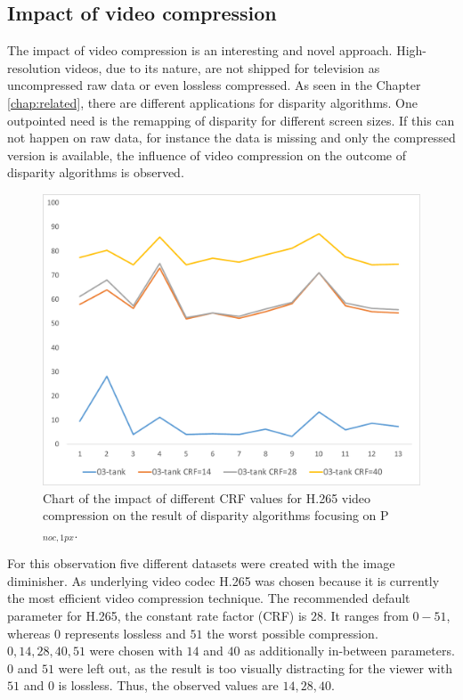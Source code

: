 \subsection{Impact of video compression}

The impact of video compression is an interesting and novel approach.
High-resolution videos, due to its nature, are not shipped for television as uncompressed raw data or even lossless compressed.
As seen in the Chapter \ref{chap:related}, there are different applications for disparity algorithms.
One outpointed need is the remapping of disparity for different screen sizes.
If this can not happen on raw data, for instance the data is missing and only the compressed version is available, the influence of video compression on the outcome of disparity algorithms is observed.

\begin{figure}[h!]
\centering
\includegraphics[width=1.0\textwidth]{src/images/evaluation/plots/03-tank-pbmp-noc-1-vc.pdf}
\caption[Chart of the impact of video compression]{Chart of the impact of different CRF values for H.265 video compression on the result of disparity algorithms focusing on P$_{noc,1px}$.}
\label{fig:eval-plots-pbmp-noc1-vc}
\end{figure}

\noindent For this observation five different datasets were created with the image diminisher.
As underlying video codec H.265 was chosen because it is currently the most efficient video compression technique.
The recommended default parameter for H.265, the constant rate factor (CRF) is $28$.
It ranges from $0-51$, whereas $0$ represents lossless and $51$ the worst possible compression.
$0, 14, 28, 40, 51$ were chosen with $14$ and $40$ as additionally in-between parameters.
$0$ and $51$ were left out, as the result is too visually distracting for the viewer with $51$ and $0$ is lossless.
Thus, the observed values are $14, 28, 40$.




